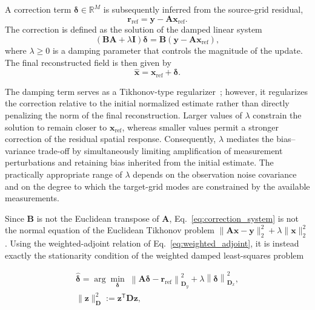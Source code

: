 \documentclass[journal]{IEEEtran}
\begin{document}
A correction term $\boldsymbol{\delta}\in\mathbb{R}^{M}$ is subsequently inferred from the source-grid residual,
\begin{equation}
\mathbf{r}_{\mathrm{ref}}
=
\mathbf{y}
-
\mathbf{A}\mathbf{x}_{\mathrm{ref}}.
\label{eq:initial_residual}
\end{equation}
The correction is defined as the solution of the damped linear system
\begin{equation}
\left(
\mathbf{B}\mathbf{A}
+
\lambda\mathbf{I}
\right)
\boldsymbol{\delta}
=
\mathbf{B}
\left(
\mathbf{y}
-
\mathbf{A}\mathbf{x}_{\mathrm{ref}}
\right),
\label{eq:correction_system}
\end{equation}
where $\lambda\geq0$ is a damping parameter that controls the magnitude of the update. The final reconstructed field is then given by
\begin{equation}
\widehat{\mathbf{x}}
=
\mathbf{x}_{\mathrm{ref}}
+
\boldsymbol{\delta}.
\label{eq:final_estimate}
\end{equation}

The damping term serves as a Tikhonov-type regularizer~\cite{tikhonov1977solutions}; however, it regularizes the correction relative to the initial normalized estimate rather than directly penalizing the norm of the final reconstruction. Larger values of $\lambda$ constrain the solution to remain closer to $\mathbf{x}_{\mathrm{ref}}$, whereas smaller values permit a stronger correction of the residual spatial response. Consequently, $\lambda$ mediates the bias--variance trade-off by simultaneously limiting amplification of measurement perturbations and retaining bias inherited from the initial estimate. The practically appropriate range of $\lambda$ depends on the observation noise covariance and on the degree to which the target-grid modes are constrained by the available measurements.

Since $\mathbf{B}$ is not the Euclidean transpose of
$\mathbf{A}$, Eq.~\eqref{eq:correction_system} is not the normal
equation of the Euclidean Tikhonov problem
$\|\mathbf{A}\mathbf{x}-\mathbf{y}\|_2^2+\lambda\|\mathbf{x}\|_2^2$.
Using the weighted-adjoint relation of
Eq.~\eqref{eq:weighted_adjoint}, it is instead exactly the
stationarity condition of the weighted damped least-squares
problem

\begin{equation}
\begin{split}
\widehat{\boldsymbol\delta}
=
\arg\min_{\boldsymbol\delta}\;
\left\|\mathbf A\boldsymbol\delta-\mathbf r_{\mathrm{ref}}\right\|^2_{\mathbf D_y}
+
\lambda\left\|\boldsymbol\delta\right\|^2_{\mathbf D_x},
\\
\|\mathbf z\|^2_{\mathbf D}:=\mathbf z^{\mathsf T}\mathbf D\mathbf z,
\end{split}
\label{eq:weighted_variational}
\end{equation}
\end{document}
